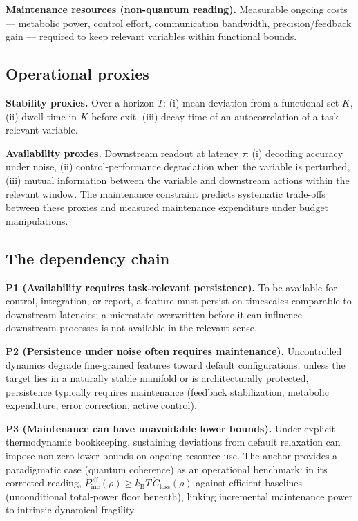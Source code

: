 \documentclass[11pt,a4paper]{article}
\newcommand{\kB}{k_{\mathrm{B}}}
\newcommand{\Closs}{\dot{C}_{\mathrm{loss}}}
\begin{document}
\textbf{Maintenance resources (non-quantum reading).} Measurable ongoing costs
--- metabolic power, control effort, communication bandwidth,
precision/feedback gain --- required to keep relevant variables within
functional bounds.

\subsection{Operational proxies}

\textbf{Stability proxies.} Over a horizon $T$: (i) mean deviation from a
functional set $K$, (ii) dwell-time in $K$ before exit, (iii) decay time of an
autocorrelation of a task-relevant variable.

\textbf{Availability proxies.} Downstream readout at latency $\tau$: (i)
decoding accuracy under noise, (ii) control-performance degradation when the
variable is perturbed, (iii) mutual information between the variable and
downstream actions within the relevant window. The maintenance constraint
predicts systematic trade-offs between these proxies and measured maintenance
expenditure under budget manipulations.

\subsection{The dependency chain}

\textbf{P1 (Availability requires task-relevant persistence).} To be available
for control, integration, or report, a feature must persist on timescales
comparable to downstream latencies; a microstate overwritten before it can
influence downstream processes is not available in the relevant sense.

\textbf{P2 (Persistence under noise often requires maintenance).} Uncontrolled
dynamics degrade fine-grained features toward default configurations; unless
the target lies in a naturally stable manifold or is architecturally protected,
persistence typically requires maintenance (feedback stabilization, metabolic
expenditure, error correction, active control).

\textbf{P3 (Maintenance can have unavoidable lower bounds).} Under explicit
thermodynamic bookkeeping, sustaining deviations from default relaxation can
impose non-zero lower bounds on ongoing resource use. The anchor provides a
paradigmatic case (quantum coherence) as an operational benchmark: in its
corrected reading,
$P^{\mathrm{eff}}_{\mathrm{inc}}(\rho) \ge \kB T\,\Closs(\rho)$ against
efficient baselines (unconditional total-power floor beneath), linking
incremental maintenance power to intrinsic dynamical fragility.
\end{document}
